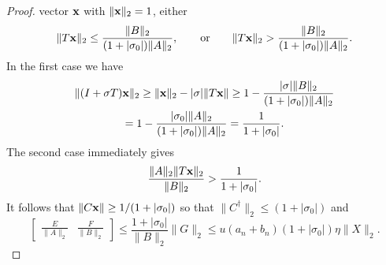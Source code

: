 \documentclass[12pt]{article}
\def\vec#1{{\bf #1}}
\begin{document}
\begin{proof}
  vector $\vec{x}$ with $\|\vec{x}\|_2 = 1$, either
  \begin{equation*}
    \|T\vec{x}\|_2 \leq \frac{\|B\|_2}{(1+|\sigma_0|)\|A\|_2},
    \qquad\mbox{or}\qquad
    \|T\vec{x}\|_2 > \frac{\|B\|_2}{(1+|\sigma_0|)\|A\|_2}.
  \end{equation*}
  In the first case we have
  \begin{multline*}
    \|(I + \sigma T) \vec{x}\|_2
    \geq \|\vec{x}\|_2 - |\sigma| \|T\vec{x}\|
    \geq 1 - \frac{|\sigma| \|B\|_2}{(1+|\sigma_0|)\|A\|_2}\\
    = 1 - \frac{|\sigma_0| \|A\|_2}{(1+|\sigma_0|)\|A\|_2}
    = \frac{1}{1+|\sigma_0|}.
  \end{multline*}
  The second case immediately gives
  \begin{equation*}
    \frac{\|A\|_2\|T\vec{x}\|_2}{\|B\|_2}  > \frac{1}{1+|\sigma_0|}.
  \end{equation*}
  It follows that $\|C\vec{x}\| \geq 1/(1+|\sigma_0|)$ so that $\|C^{\dagger}\|_2\leq (1+|\sigma_0|)$ and
  \begin{equation*}
    \begin{bmatrix}
      \frac{E}{\|A\|_2} & \frac{F}{\|B\|_2}
    \end{bmatrix}
    \leq \frac{1+|\sigma_0|}{\|B\|_2} \|G\|_2
    \leq u(a_n+b_n) (1+|\sigma_0|)\eta \|X\|_2.
  \end{equation*}
\end{proof}





\end{document}
